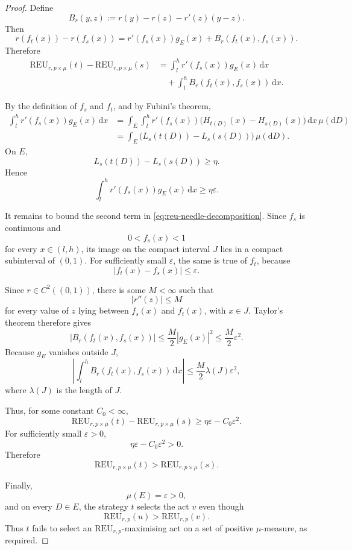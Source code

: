 \documentclass[a4paper,final]{article}
\newcommand\REU{\mathrm{REU}}
\renewcommand{\leq}{\leqslant}
\renewcommand{\geq}{\geqslant}
\newenvironment{CCM rewritten}
{\begingroup\color{blue}} %
{\endgroup}              %
\begin{document}
\begin{proof}
Define
\[
B_r(y,z)
:=
r(y)-r(z)-r'(z)(y-z).
\]
Then
\[
r(f_t(x))-r(f_s(x))
=
r'(f_s(x))g_E(x)
+
B_r(f_t(x),f_s(x)).
\]
Therefore
\begin{align}
\REU_{r,p\times\mu}(t)
-
\REU_{r,p\times\mu}(s)
&=
\int_l^h r'(f_s(x))g_E(x)\,\mathrm dx
\\
&\quad+
\int_l^h
B_r(f_t(x),f_s(x))
\,\mathrm dx.
\label{eq:reu-needle-decomposition}
\end{align}

By the definition of \(f_s\) and \(f_t\), and by Fubini's theorem,
\begin{align}
\int_l^h r'(f_s(x))g_E(x)\,\mathrm dx
&=
\int_E
\int_l^h
r'(f_s(x))
\bigl(H_{t(D)}(x)-H_{s(D)}(x)\bigr)
\,\mathrm dx
\,\mu(\mathrm dD)
\\
&=
\int_E
\bigl(L_s(t(D))-L_s(s(D))\bigr)
\,\mu(\mathrm dD).
\end{align}
On \(E\),
\[
L_s(t(D))-L_s(s(D))\geq\eta.
\]
Hence
\[
\int_l^h r'(f_s(x))g_E(x)\,\mathrm dx
\geq
\eta\varepsilon.
\]

It remains to bound the second term in
\eqref{eq:reu-needle-decomposition}. Since \(f_s\) is continuous and
\[
0<f_s(x)<1
\]
for every \(x\in(l,h)\), its image on the compact interval \(J\) lies
in a compact subinterval of \((0,1)\). For sufficiently small
\(\varepsilon\), the same is true of \(f_t\), because
\[
|f_t(x)-f_s(x)|\leq\varepsilon.
\]

Since \(r\in C^2((0,1))\), there is some \(M<\infty\) such that
\[
|r''(z)|\leq M
\]
for every value of \(z\) lying between \(f_s(x)\) and \(f_t(x)\), with
\(x\in J\). Taylor's theorem therefore gives
\[
|B_r(f_t(x),f_s(x))|
\leq
\frac{M}{2}|g_E(x)|^2
\leq
\frac{M}{2}\varepsilon^2.
\]
Because \(g_E\) vanishes outside \(J\),
\[
\left|
\int_l^h
B_r(f_t(x),f_s(x))
\,\mathrm dx
\right|
\leq
\frac{M}{2}\lambda(J)\varepsilon^2,
\]
where \(\lambda(J)\) is the length of \(J\).

Thus, for some constant \(C_0<\infty\),
\[
\REU_{r,p\times\mu}(t)
-
\REU_{r,p\times\mu}(s)
\geq
\eta\varepsilon-C_0\varepsilon^2.
\]
For sufficiently small \(\varepsilon>0\),
\[
\eta\varepsilon-C_0\varepsilon^2>0.
\]
Therefore
\[
\REU_{r,p\times\mu}(t)
>
\REU_{r,p\times\mu}(s).
\]

Finally,
\[
\mu(E)=\varepsilon>0,
\]
and on every \(D\in E\), the strategy \(t\) selects the act \(v\)
even though
\[
\REU_{r,p}(u)>\REU_{r,p}(v).
\]
Thus \(t\) fails to select an \(\REU_{r,p}\)-maximising act on a set
of positive \(\mu\)-measure, as required.
\end{proof}
\end{document}
